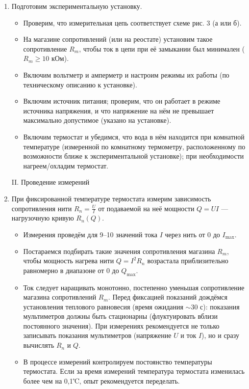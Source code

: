 \documentclass[a4paper,12pt]{article} %
\begin{document}
\begin{enumerate}
\item Подготовим экспериментальную установку.
\begin{itemize}
  \item Проверим, что измерительная цепь соответствует схеме рис. 3 (а или б).
  \item На магазине сопротивлений (или на реостате) установим такое сопротивление $R_m$, чтобы ток в цепи при её замыкании был минимален ($R_m \geq 10$ кОм).
  \item Включим вольтметр и амперметр и настроим режимы их работы (по техническому описанию к установке).
  \item Включим источник питания; проверим, что он работает в режиме источника напряжения, и что напряжение на нём не превышает максимально допустимое (указано на установке).
  \item Включим термостат и убедимся, что вода в нём находится при комнатной температуре (измеренной по комнатному термометру, расположенному по возможности ближе к экспериментальной установке); при необходимости нагреем/охладим термостат.
\end{itemize}

\begin{center}
  \textsf{II. Проведение измерений}
\end{center}

    \item При фиксированной температуре термостата измерим зависимость сопротивления нити $R_n = \frac{U}{I}$ от подаваемой на неё мощности $Q = U I$ — нагрузочную кривую $R_n(Q)$.
    \begin{itemize}
      \item Измерения проведём для 9–10 значений тока $I$ через нить от 0 до $I_{\text{max}}$.
      \item Постараемся подбирать такие значения сопротивления магазина $R_m$, чтобы мощность нагрева нити $Q = I^2 R_n$ возрастала приблизительно равномерно в диапазоне от 0 до $Q_{\text{max}}$.
      \item Ток следует наращивать монотонно, постепенно уменьшая сопротивление магазина сопротивлений $R_m$. Перед фиксацией показаний дождёмся установления теплового равновесия (время ожидания $\sim 30$ с): показания мультиметров должны быть стационарны (флуктуировать вблизи постоянного значения). При измерениях рекомендуется не только записывать показания мультиметров (напряжение $U$ и ток $I$), но и сразу вычислять $R_n$ и $Q$.
      \item В процессе измерений контролируем постоянство температуры термостата. Если за время измерений температура термостата изменилась более чем на 0,1℃, опыт рекомендуется переделать.
    \end{itemize}


\end{enumerate}
\end{document}
